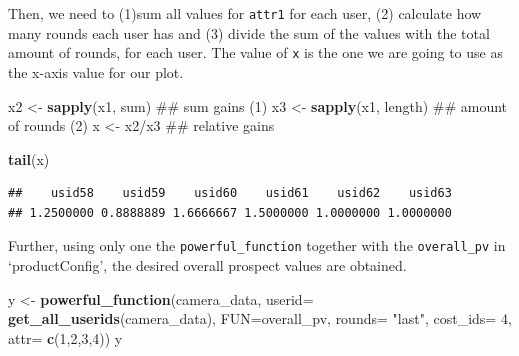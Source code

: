 \documentclass[]{article}
\newenvironment{Shaded}{\begin{snugshade}}{\end{snugshade}}
\newcommand{\KeywordTok}[1]{\textcolor[rgb]{0.13,0.29,0.53}{\textbf{{#1}}}}
\newcommand{\DataTypeTok}[1]{\textcolor[rgb]{0.13,0.29,0.53}{{#1}}}
\newcommand{\DecValTok}[1]{\textcolor[rgb]{0.00,0.00,0.81}{{#1}}}
\newcommand{\StringTok}[1]{\textcolor[rgb]{0.31,0.60,0.02}{{#1}}}
\newcommand{\NormalTok}[1]{{#1}}
\begin{document}
Then, we need to (1)sum all values for \texttt{attr1} for each user, (2)
calculate how many rounds each user has and (3) divide the sum of the
values with the total amount of rounds, for each user. The value of
\texttt{x} is the one we are going to use as the x-axis value for our
plot.

\begin{Shaded}
\begin{Highlighting}[]
\NormalTok{x2 <-}\StringTok{ }\KeywordTok{sapply}\NormalTok{(x1, sum)     ## sum gains (1)}
\NormalTok{x3 <-}\StringTok{ }\KeywordTok{sapply}\NormalTok{(x1, length)  ## amount of rounds (2)}
\NormalTok{x <-}\StringTok{ }\NormalTok{x2/x3                ## relative gains}
\end{Highlighting}
\end{Shaded}

\begin{Shaded}
\begin{Highlighting}[]
\KeywordTok{tail}\NormalTok{(x)}
\end{Highlighting}
\end{Shaded}

\begin{verbatim}
##    usid58    usid59    usid60    usid61    usid62    usid63 
## 1.2500000 0.8888889 1.6666667 1.5000000 1.0000000 1.0000000
\end{verbatim}

Further, using only one the \texttt{powerful\_function} together with
the \texttt{overall\_pv} in `productConfig', the desired overall
prospect values are obtained.

\begin{Shaded}
\begin{Highlighting}[]
\NormalTok{y <-}\StringTok{ }\KeywordTok{powerful_function}\NormalTok{(camera_data, }\DataTypeTok{userid=} \KeywordTok{get_all_userids}\NormalTok{(camera_data), }
                       \DataTypeTok{FUN=}\NormalTok{overall_pv, }
                       \DataTypeTok{rounds=} \StringTok{"last"}\NormalTok{,}
                       \DataTypeTok{cost_ids=} \DecValTok{4}\NormalTok{, }
                       \DataTypeTok{attr=} \KeywordTok{c}\NormalTok{(}\DecValTok{1}\NormalTok{,}\DecValTok{2}\NormalTok{,}\DecValTok{3}\NormalTok{,}\DecValTok{4}\NormalTok{))}
\NormalTok{y}
\end{Highlighting}
\end{Shaded}
\end{document}

